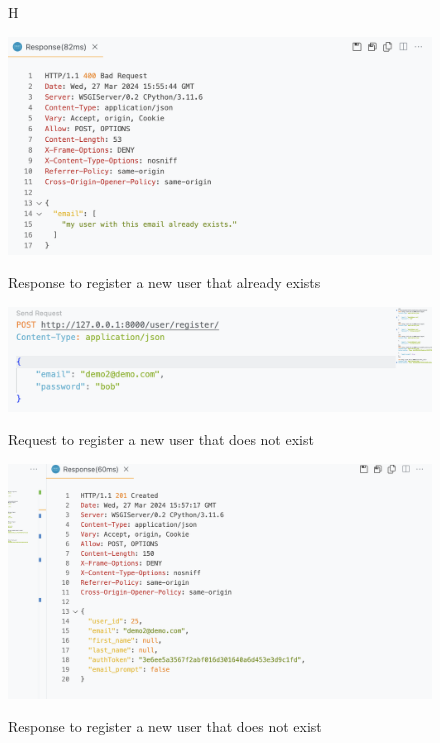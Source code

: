 \begin{figure}{H}
    \caption{Response to register a new user that already exists}
    \includegraphics[width=\textwidth]{Assets/api_test/response_register_already_exist.png}
    \label{fig:response_register_already_exist}
\end{figure}

\begin{figure}[H]
    \caption{Request to register a new user that does not exist}
    \includegraphics[width=\textwidth]{Assets/api_test/request_register_sucess.png}
    \label{fig:request_register_new_user}
\end{figure}

\begin{figure}[H]
    \caption{Response to register a new user that does not exist}
    \includegraphics[width=\textwidth]{Assets/api_test/response_register_sucess.png}
    \label{fig:response_register_new_user}
\end{figure}

